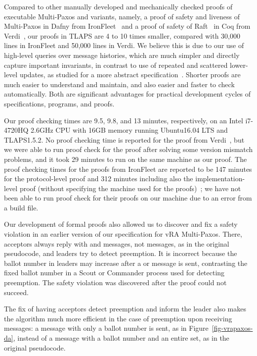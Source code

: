 \documentclass[11pt]{article}
\begin{document}
{Compared to %
other manually developed and mechanically checked proofs
of executable Multi-Paxos and variants, namely, a proof of safety and
liveness of Multi-Paxos in Dafny from
IronFleet~\cite{hawblitzel2015ironfleet} and a proof of safety of
Raft~\cite{ongaro14raft} in Coq from Verdi~\cite{woos2016planning}, %
our proofs in TLAPS are %
4 to 10 times smaller, %
compared with 30,000 lines in IronFleet and 50,000 lines in Verdi.
We believe this is due to our use of high-level queries over message
histories, which are much simpler and directly capture important
invariants, in contrast to use of repeated and scattered lower-level
updates, as studied for a more abstract
specification~\cite{ChaLiu18PaxosHistVarTLAPS-NFM}.
Shorter proofs are much easier to understand and maintain, and also easier
and faster to check automatically.  Both are significant advantages for
practical development cycles of specifications, programs, and proofs.

Our proof checking times are 9.5, 9.8, and 13 minutes, respectively, on an
Intel i7-4720HQ 2.6GHz CPU with 16GB memory running Ubuntu16.04 LTS and
TLAPS1.5.2.
No proof checking time is reported for the proof from
Verdi~\cite{woos2016planning}, but we were able to run proof check for the
proof after solving some version mismatch problems, and it took 29 minutes
to run on the same machine as our proof.
The proof checking times for the proofs from IronFleet are reported to be
147 minutes for the protocol-level proof and 312 minutes including also the
implementation-level proof (without specifying the machine used for the
proofs)~\cite{hawblitzel2015ironfleet}; we have not been able to run proof
check for their proofs on our machine due to an error from a build file.


\label{sec-safety-violation}

Our development of formal proofs also allowed us to discover and fix a
safety violation in an earlier version of our specification for vRA
Multi-Paxos.  There, acceptors always reply with  and 
messages, not  messages, as in the original pseudocode, and
leaders try to detect preemption.
It is incorrect because the ballot number in leaders may increase after a
 or  message is sent, contrasting the fixed ballot number in
a Scout or Commander process used for detecting preemption.
The safety violation was discovered after the proof could not succeed.

The fix of having acceptors detect preemption and inform the leader also
makes the algorithm much more efficient in the case of preemption upon
receiving  messages: a  message with only a ballot
number is sent, as in Figure~\ref{fig-vrapaxos-da}, instead of a 
message with a ballot number and an entire  set, as in the
original pseudocode.

}
\end{document}
